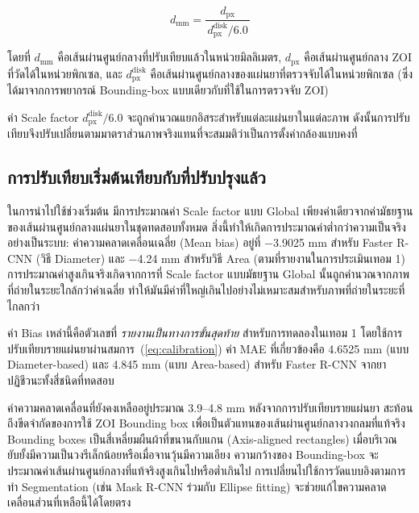 \begin{equation}
  d_{\mathrm{mm}} = \frac{d_{\mathrm{px}}}{\,d^{\mathrm{disk}}_{\mathrm{px}} / 6.0\,}
  \label{eq:calibration}
\end{equation}

โดยที่ $d_{\mathrm{mm}}$ คือเส้นผ่านศูนย์กลางที่ปรับเทียบแล้วในหน่วยมิลลิเมตร,
$d_{\mathrm{px}}$ คือเส้นผ่านศูนย์กลาง ZOI ที่วัดได้ในหน่วยพิกเซล,
และ $d^{\mathrm{disk}}_{\mathrm{px}}$ คือเส้นผ่านศูนย์กลางของแผ่นยาที่ตรวจจับได้ในหน่วยพิกเซล
(ซึ่งได้มาจากการพยากรณ์ Bounding-box แบบเดียวกับที่ใช้ในการตรวจจับ ZOI)

ค่า Scale factor $d^{\mathrm{disk}}_{\mathrm{px}} / 6.0$ จะถูกคำนวณแยกอิสระสำหรับแต่ละแผ่นยาในแต่ละภาพ ดังนั้นการปรับเทียบจึงปรับเปลี่ยนตามมาตราส่วนภาพจริงแทนที่จะสมมติว่าเป็นการตั้งค่ากล้องแบบคงที่

\subsection{การปรับเทียบเริ่มต้นเทียบกับที่ปรับปรุงแล้ว}

ในการนำไปใช้ช่วงเริ่มต้น มีการประมาณค่า Scale factor แบบ Global เพียงค่าเดียวจากค่ามัธยฐานของเส้นผ่านศูนย์กลางแผ่นยาในชุดทดสอบทั้งหมด
สิ่งนี้ทำให้เกิดการประมาณค่าต่ำกว่าความเป็นจริงอย่างเป็นระบบ: ค่าความคลาดเคลื่อนเฉลี่ย (Mean bias) อยู่ที่ $-$3.9025 mm สำหรับ Faster R-CNN (วิธี Diameter) และ $-$4.24 mm สำหรับวิธี Area (ตามที่รายงานในการประเมินเทอม 1)
การประมาณค่าสูงเกินจริงเกิดจากการที่ Scale factor แบบมัธยฐาน Global นั้นถูกคำนวณจากภาพที่ถ่ายในระยะใกล้กว่าค่าเฉลี่ย ทำให้มันมีค่าที่ใหญ่เกินไปอย่างไม่เหมาะสมสำหรับภาพที่ถ่ายในระยะที่ไกลกว่า

ค่า Bias เหล่านี้คือตัวเลขที่ \emph{รายงานเป็นทางการขั้นสุดท้าย} สำหรับการทดลองในเทอม 1 โดยใช้การปรับเทียบรายแผ่นยาผ่านสมการ~(\ref{eq:calibration})
ค่า MAE ที่เกี่ยวข้องคือ 4.6525 mm (แบบ Diameter-based) และ 4.845 mm (แบบ Area-based) สำหรับ Faster R-CNN จากยาปฏิชีวนะทั้งสี่ชนิดที่ทดสอบ

ค่าความคลาดเคลื่อนที่ยังคงเหลืออยู่ประมาณ 3.9--4.8 mm หลังจากการปรับเทียบรายแผ่นยา สะท้อนถึงขีดจำกัดของการใช้ ZOI Bounding box เพื่อเป็นตัวแทนของเส้นผ่านศูนย์กลางวงกลมที่แท้จริง Bounding boxes เป็นสี่เหลี่ยมผืนผ้าที่ขนานกับแกน (Axis-aligned rectangles) เมื่อบริเวณยับยั้งมีความเป็นวงรีเล็กน้อยหรือเมื่อจานวุ้นมีความเอียง ความกว้างของ Bounding-box จะประมาณค่าเส้นผ่านศูนย์กลางที่แท้จริงสูงเกินไปหรือต่ำเกินไป
การเปลี่ยนไปใช้การวัดแบบอิงตามการทำ Segmentation (เช่น Mask R-CNN ร่วมกับ Ellipse fitting) จะช่วยแก้ไขความคลาดเคลื่อนส่วนที่เหลือนี้ได้โดยตรง

